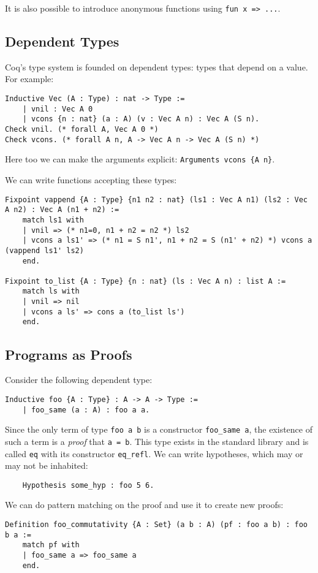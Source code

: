 It is also possible to introduce anonymous functions using \lstinline{fun x => ...}.

\subsection{Dependent Types}
Coq's type system is founded on dependent types: types that depend on a value. For example:
\begin{lstlisting}
Inductive Vec (A : Type) : nat -> Type := 
    | vnil : Vec A 0
    | vcons {n : nat} (a : A) (v : Vec A n) : Vec A (S n).
Check vnil. (* forall A, Vec A 0 *)
Check vcons. (* forall A n, A -> Vec A n -> Vec A (S n) *)
\end{lstlisting}

Here too we can make the arguments explicit: \lstinline|Arguments vcons {A n}|.

We can write functions accepting these types:
\begin{lstlisting}
Fixpoint vappend {A : Type} {n1 n2 : nat} (ls1 : Vec A n1) (ls2 : Vec A n2) : Vec A (n1 + n2) :=
	match ls1 with
	| vnil => (* n1=0, n1 + n2 = n2 *) ls2
	| vcons a ls1' => (* n1 = S n1', n1 + n2 = S (n1' + n2) *) vcons a (vappend ls1' ls2)
	end.

Fixpoint to_list {A : Type} {n : nat} (ls : Vec A n) : list A :=
	match ls with
	| vnil => nil
	| vcons a ls' => cons a (to_list ls')
	end.
\end{lstlisting}

\subsection{Programs as Proofs}
Consider the following dependent type:
\begin{lstlisting}
Inductive foo {A : Type} : A -> A -> Type :=
    | foo_same (a : A) : foo a a.
\end{lstlisting}

Since the only term of type \lstinline{foo a b} is a constructor \lstinline{foo_same a}, the existence
of such a term is a \emph{proof} that \lstinline{a = b}. This type exists in the standard library
and is called \lstinline{eq} with its constructor \lstinline{eq_refl}.
We can write hypotheses, which may or may not be inhabited:
\begin{lstlisting}
	Hypothesis some_hyp : foo 5 6.
\end{lstlisting}

We can do pattern matching on the proof and use it to create new proofs:
\begin{lstlisting}
Definition foo_commutativity {A : Set} (a b : A) (pf : foo a b) : foo b a :=
	match pf with
	| foo_same a => foo_same a
	end.
\end{lstlisting}

